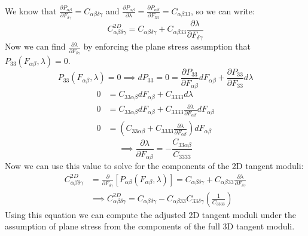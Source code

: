 \documentclass[]{spie}  %
\begin{document}
We know that $\frac{\partial P_{\alpha\beta}}{\partial F_{\delta\gamma}} = C_{\alpha\beta\delta\gamma}$ and $\frac{\partial P_{\alpha\beta}}{\partial \lambda} = \frac{\partial P_{\alpha\beta}}{\partial F_{33}} = C_{\alpha\beta 3 3}$, so we can write:
\begin{equation}
C^{2D}_{\alpha\beta\delta\gamma} = C_{\alpha\beta\delta\gamma} + C_{\alpha\beta 3 3} \frac{\partial \lambda}{\partial F_{\delta\gamma}}
\end{equation}
Now we can find $\frac{\partial \lambda}{\partial F_{\delta\gamma}}$ by enforcing the plane stress assumption that $P_{33}(F_{\alpha\beta}, \lambda) = 0$. 
\begin{equation}
P_{33}(F_{\alpha\beta}, \lambda) = 0 \implies dP_{33} = 0 = \frac{\partial P_{33}}{\partial F_{\alpha\beta}} dF_{\alpha\beta} + \frac{\partial P_{33}}{\partial F_{33}} d\lambda
\end{equation}
\begin{align}
0 &= C_{3 3 \alpha\beta} dF_{\alpha\beta} + C_{3333} d\lambda \\
0 &= C_{3 3 \alpha\beta} dF_{\alpha\beta} + C_{3333} \frac{\partial \lambda}{\partial F_{\alpha\beta}} dF_{\alpha\beta} \\
0 &= \left( C_{3 3 \alpha\beta} + C_{3333} \frac{\partial \lambda}{\partial F_{\alpha\beta}} \right) dF_{\alpha\beta}
\end{align}
\begin{equation}
\implies \frac{\partial \lambda}{\partial F_{\alpha\beta}} = - \frac{C_{3 3 \alpha\beta}}{C_{3333}}
\end{equation}
Now we can use this value to solve for the components of the 2D tangent moduli:
\begin{align}
C^{2D}_{\alpha\beta\delta\gamma} &= \frac{\partial}{\partial F_{\delta\gamma}} \left[ P_{\alpha\beta}(F_{\alpha\beta},
\lambda)\right] = C_{\alpha\beta\delta\gamma} + C_{\alpha\beta 3 3} \frac{\partial \lambda}{\partial F_{\delta\gamma}} \\
& \implies C^{2D}_{\alpha\beta\delta\gamma} = C_{\alpha\beta\delta\gamma} - C_{\alpha\beta 3 3} C_{3 3 \delta\gamma} \left(\frac{1}{C_{3333}}\right)
\label{eq: 2d tangent moduli}
\end{align}
Using this equation we can compute the adjusted 2D tangent moduli under the assumption of plane stress from the components of the full 3D tangent moduli. 

\end{document}
